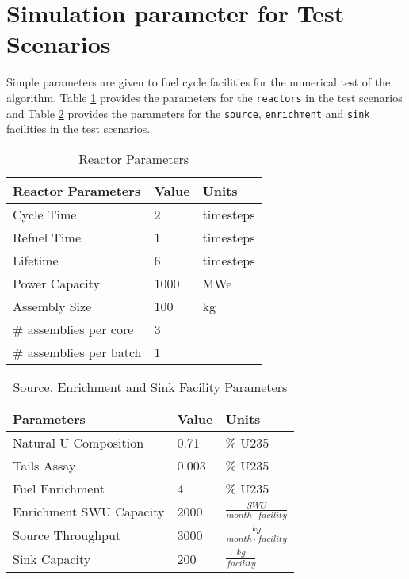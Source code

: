 \documentclass[12pt,letterpaper]{article}
\begin{document}
 




\section{Simulation parameter for Test Scenarios}
Simple parameters are given to fuel cycle facilities for the numerical test of 
the algorithm.  
Table \ref{tab:reactor} provides the parameters for the \texttt{reactors} in the test scenarios and Table \ref{tab:everythingelse} provides the parameters for the \texttt{source}, \texttt{enrichment} and \texttt{sink} facilities in the test scenarios.

\begin{table}[h]
    \centering
    \begin{tabularx}{\textwidth}{bbb}
       \hline
       Reactor Parameters & Value & Units \\
       \hline
       Cycle Time & 2 & timesteps \\
       Refuel Time & 1 & timesteps \\
       Lifetime & 6 & timesteps \\
       Power Capacity & 1000 & MWe \\
       Assembly Size & 100 & kg \\
       \# assemblies per core & 3 & \\
       \# assemblies per batch & 1 & \\
       \hline
    \end{tabularx}
    \caption {Reactor Parameters}
    \label{tab:reactor}
\end{table}

\begin{table}[H]
     \centering
    \begin{tabularx}{\textwidth}{bbb}
       \hline
       Parameters & Value & Units \\
       \hline
       Natural U Composition & 0.71 & \% U235\\
       Tails Assay & 0.003 & \% U235 \\
       Fuel Enrichment & 4 & \% U235 \\
       Enrichment SWU Capacity & 2000 & $\frac{SWU}{month \cdot facility}$ \\
       Source Throughput & 3000 & $\frac{kg}{month \cdot facility}$\\
       Sink Capacity & 200 &  $\frac{kg}{facility}$ \\
       \hline
    \end{tabularx}
    \caption {Source, Enrichment and Sink Facility Parameters}
    \label{tab:everythingelse}
\end{table}
\end{document}
